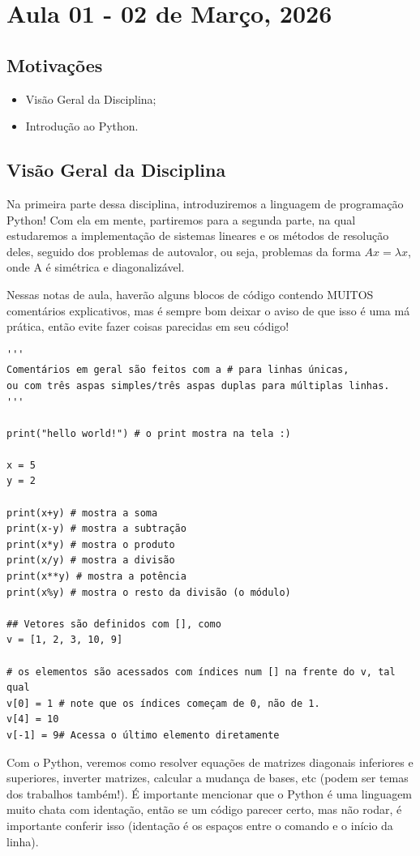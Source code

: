\documentclass[../numerical_methods.tex]{subfiles}
\begin{document}
\section{Aula 01 - 02 de Março, 2026}
\subsection{Motivações}
\begin{itemize}
	\item Visão Geral da Disciplina;
	\item Introdução ao Python.
\end{itemize}
\subsection{Visão Geral da Disciplina}
Na primeira parte dessa disciplina, introduziremos a linguagem de programação Python! Com ela em mente, partiremos para a segunda parte, na qual estudaremos a implementação de sistemas lineares e os métodos de resolução deles, seguido dos problemas de autovalor, ou seja, problemas da forma \(Ax=\lambda x\), onde A é simétrica e diagonalizável.

Nessas notas de aula, haverão alguns blocos de código contendo MUITOS comentários explicativos, mas é sempre bom deixar o aviso de que isso é uma má prática, então evite fazer coisas parecidas em seu código!
\begin{verbatim}
'''
Comentários em geral são feitos com a # para linhas únicas, 
ou com três aspas simples/três aspas duplas para múltiplas linhas.
'''

print("hello world!") # o print mostra na tela :)

x = 5 
y = 2

print(x+y) # mostra a soma
print(x-y) # mostra a subtração
print(x*y) # mostra o produto
print(x/y) # mostra a divisão 
print(x**y) # mostra a potência
print(x%y) # mostra o resto da divisão (o módulo)

## Vetores são definidos com [], como 
v = [1, 2, 3, 10, 9]

# os elementos são acessados com índices num [] na frente do v, tal qual 
v[0] = 1 # note que os índices começam de 0, não de 1.
v[4] = 10
v[-1] = 9# Acessa o último elemento diretamente
\end{verbatim}

Com o Python, veremos como resolver equações de matrizes diagonais inferiores e superiores, inverter matrizes, calcular a mudança de bases, etc (podem ser temas dos trabalhos também!).
É importante mencionar que o Python é uma linguagem muito chata com identação, então se um código parecer certo, mas não rodar, é importante conferir isso (identação é os espaços entre o comando e o início da linha).
\end{document}
